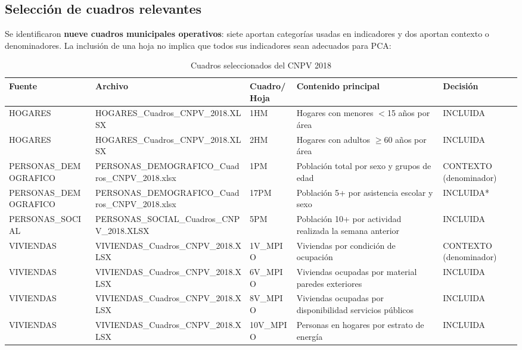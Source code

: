 \subsection{Selección de cuadros relevantes}
\label{sec:seleccion_cuadros}

Se identificaron \textbf{nueve cuadros municipales operativos}: siete aportan categorías usadas en indicadores y dos aportan contexto o denominadores. La inclusión de una hoja no implica que todos sus indicadores sean adecuados para PCA:

\begin{table}[htbp]
\centering
\caption{Cuadros seleccionados del CNPV 2018}
\label{tab:cuadros_seleccionados}
\begin{adjustbox}{max width=\textwidth}
\begin{tabular}{@{}lllll@{}}
\toprule
\textbf{Fuente} & \textbf{Archivo} & \textbf{Cuadro/Hoja} & \textbf{Contenido principal} & \textbf{Decisión} \\
\midrule
HOGARES & HOGARES\_Cuadros\_CNPV\_2018.XLSX & 1HM & Hogares con menores $<$15 años por área & INCLUIDA \\
HOGARES & HOGARES\_Cuadros\_CNPV\_2018.XLSX & 2HM & Hogares con adultos $\ge$60 años por área & INCLUIDA \\
PERSONAS\_DEMOGRAFICO & PERSONAS\_DEMOGRAFICO\_Cuadros\_CNPV\_2018.xlsx & 1PM & Población total por sexo y grupos de edad & CONTEXTO (denominador) \\
PERSONAS\_DEMOGRAFICO & PERSONAS\_DEMOGRAFICO\_Cuadros\_CNPV\_2018.xlsx & 17PM & Población 5+ por asistencia escolar y sexo & INCLUIDA* \\
PERSONAS\_SOCIAL & PERSONAS\_SOCIAL\_Cuadros\_CNPV\_2018.XLSX & 5PM & Población 10+ por actividad realizada la semana anterior & INCLUIDA \\
VIVIENDAS & VIVIENDAS\_Cuadros\_CNPV\_2018.XLSX & 1V\_MPIO & Viviendas por condición de ocupación & CONTEXTO (denominador) \\
VIVIENDAS & VIVIENDAS\_Cuadros\_CNPV\_2018.XLSX & 6V\_MPIO & Viviendas ocupadas por material paredes exteriores & INCLUIDA \\
VIVIENDAS & VIVIENDAS\_Cuadros\_CNPV\_2018.XLSX & 8V\_MPIO & Viviendas ocupadas por disponibilidad servicios públicos & INCLUIDA \\
VIVIENDAS & VIVIENDAS\_Cuadros\_CNPV\_2018.XLSX & 10V\_MPIO & Personas en hogares por estrato de energía & INCLUIDA \\
\bottomrule
\end{tabular}
\end{adjustbox}
\end{table}

